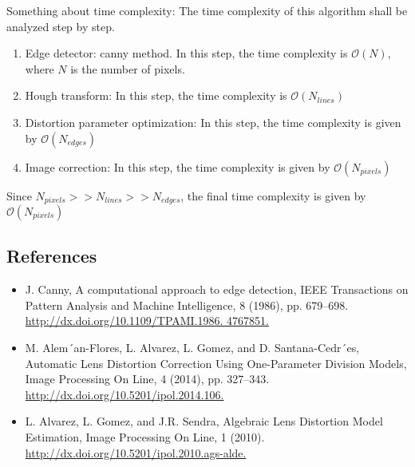 \documentclass{article}
\begin{document}
\begin{Algorithm}
\end{Algorithm}
\newpage
Something about time complexity: The time complexity of this algorithm shall be analyzed step by step. 
\begin{enumerate}
\item Edge detector: canny method. In this step, the time complexity is $\mathcal{O}(N)$, where $N$ is the number of pixels.
\item Hough transform: In this step, the time complexity is $\mathcal{O}(N_{lines})$
\item Distortion parameter optimization: In this step, the time complexity is given by $\mathcal{O}(N_{edges})$
\item Image correction: In this step, the time complexity is given by $\mathcal{O}(N_{pixels})$
\end{enumerate}
Since $N_{pixels} >> N_{lines} >> N_{edges}$, the final time complexity is given by $\mathcal{O}(N_{pixels})$
\subsection*{References}

\begin{itemize}\itemsep .125cm
	\item \label{canny}J. Canny, A computational approach to edge detection, IEEE Transactions on Pattern Analysis and Machine Intelligence, 8 (1986), pp. 679–698. \url{http://dx.doi.org/10.1109/TPAMI.1986. 4767851.}
	\item M. Alem´an-Flores, L. Alvarez, L. Gomez, and D. Santana-Cedr´es, Automatic Lens Distortion Correction Using One-Parameter Division Models, Image Processing On Line, 4 (2014), pp. 327–343. \url{http://dx.doi.org/10.5201/ipol.2014.106.}
	\item L. Alvarez, L. Gomez, and J.R. Sendra, Algebraic Lens Distortion Model Estimation, Image Processing On Line, 1 (2010). \url{http://dx.doi.org/10.5201/ipol.2010.ags-alde.}
\end{itemize}

\ifx\onefile\undefined
	
\end{document}
